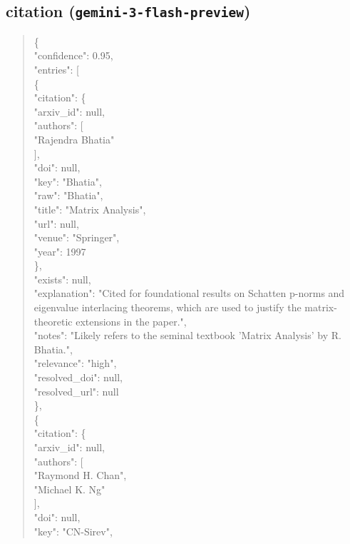 \documentclass[11pt]{article}
\begin{document}
\subsection*{citation (\texttt{gemini-3-flash-preview})}
\begin{quote}\small\ttfamily\raggedright
\{\\
  "confidence": 0.95,\\
  "entries": [\\
    \{\\
      "citation": \{\\
        "arxiv\_id": null,\\
        "authors": [\\
          "Rajendra Bhatia"\\
        ],\\
        "doi": null,\\
        "key": "Bhatia",\\
        "raw": "Bhatia",\\
        "title": "Matrix Analysis",\\
        "url": null,\\
        "venue": "Springer",\\
        "year": 1997\\
      \},\\
      "exists": null,\\
      "explanation": "Cited for foundational results on Schatten p-norms and eigenvalue interlacing theorems, which are used to justify the matrix-theoretic extensions in the paper.",\\
      "notes": "Likely refers to the seminal textbook 'Matrix Analysis' by R. Bhatia.",\\
      "relevance": "high",\\
      "resolved\_doi": null,\\
      "resolved\_url": null\\
    \},\\
    \{\\
      "citation": \{\\
        "arxiv\_id": null,\\
        "authors": [\\
          "Raymond H. Chan",\\
          "Michael K. Ng"\\
        ],\\
        "doi": null,\\
        "key": "CN-Sirev",\\

\end{quote}
\end{document}
